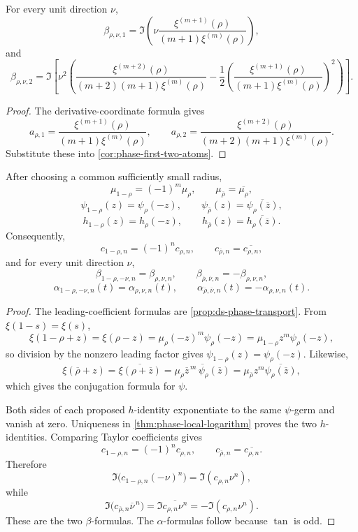\begin{corollary}
\label{cor:phase-packet-first-two}
For every unit direction \(\nu\),
\[
 \beta_{\rho,\nu,1}
 =
 \Im\left(
 \nu\frac{\xi^{(m+1)}(\rho)}
 {(m+1)\xi^{(m)}(\rho)}
 \right),
\]
and
\[
 \beta_{\rho,\nu,2}
 =
 \Im\left[
 \nu^2\left(
 \frac{\xi^{(m+2)}(\rho)}
 {(m+2)(m+1)\xi^{(m)}(\rho)}
 -
 \frac12
 \left(
 \frac{\xi^{(m+1)}(\rho)}
 {(m+1)\xi^{(m)}(\rho)}
 \right)^2
 \right)
 \right].
\]
\end{corollary}

\begin{proof}
The derivative-coordinate formula gives
\[
 a_{\rho,1}
 =
 \frac{\xi^{(m+1)}(\rho)}
 {(m+1)\xi^{(m)}(\rho)},
\qquad
 a_{\rho,2}
 =
 \frac{\xi^{(m+2)}(\rho)}
 {(m+2)(m+1)\xi^{(m)}(\rho)}.
\]
Substitute these into \cref{cor:phase-first-two-atoms}.
\end{proof}

\begin{proposition}
\label{prop:phase-packet-atom-transport}
After choosing a common sufficiently small radius,
\[
 \mu_{1-\rho}=(-1)^m\mu_\rho,
\qquad
 \mu_{\overline\rho}=\overline{\mu_\rho},
\]
\[
 \psi_{1-\rho}(z)=\psi_\rho(-z),
\qquad
 \psi_{\overline\rho}(z)=\overline{\psi_\rho(\overline z)},
\]
\[
 h_{1-\rho}(z)=h_\rho(-z),
\qquad
 h_{\overline\rho}(z)=\overline{h_\rho(\overline z)}.
\]
Consequently,
\[
 c_{1-\rho,n}=(-1)^nc_{\rho,n},
\qquad
 c_{\overline\rho,n}=\overline{c_{\rho,n}},
\]
and for every unit direction \(\nu\),
\[
 \beta_{1-\rho,-\nu,n}=\beta_{\rho,\nu,n},
\qquad
 \beta_{\overline\rho,\overline\nu,n}=-\beta_{\rho,\nu,n},
\]
\[
 \alpha_{1-\rho,-\nu,n}(t)=\alpha_{\rho,\nu,n}(t),
\qquad
 \alpha_{\overline\rho,\overline\nu,n}(t)
 =
 -\alpha_{\rho,\nu,n}(t).
\]
\end{proposition}

\begin{proof}
The leading-coefficient formulas are
\cref{prop:ds-phase-transport}.  From \(\xi(1-s)=\xi(s)\),
\[
 \xi(1-\rho+z)
 =
 \xi(\rho-z)
 =
 \mu_\rho(-z)^m\psi_\rho(-z)
 =
 \mu_{1-\rho}z^m\psi_\rho(-z),
\]
so division by the nonzero leading factor gives
\(\psi_{1-\rho}(z)=\psi_\rho(-z)\).  Likewise,
\[
 \xi(\overline\rho+z)
 =
 \overline{\xi(\rho+\overline z)}
 =
 \overline{\mu_\rho\overline z^{\,m}
 \,\psi_\rho(\overline z)}
 =
 \mu_{\overline\rho}z^m
 \overline{\psi_\rho(\overline z)},
\]
which gives the conjugation formula for \(\psi\).

Both sides of each proposed \(h\)-identity exponentiate to the same
\(\psi\)-germ and vanish at zero.  Uniqueness in
\cref{thm:phase-local-logarithm} proves the two \(h\)-identities.  Comparing
Taylor coefficients gives
\[
 c_{1-\rho,n}=(-1)^nc_{\rho,n},
\qquad
 c_{\overline\rho,n}=\overline{c_{\rho,n}}.
\]
Therefore
\[
 \Im\bigl(c_{1-\rho,n}(-\nu)^n\bigr)
 =
 \Im(c_{\rho,n}\nu^n),
\]
while
\[
 \Im\bigl(c_{\overline\rho,n}\overline\nu^{\,n}\bigr)
 =
 \Im\overline{c_{\rho,n}\nu^n}
 =
 -\Im(c_{\rho,n}\nu^n).
\]
These are the two \(\beta\)-formulas.  The \(\alpha\)-formulas follow because
\(\tan\) is odd.
\end{proof}

